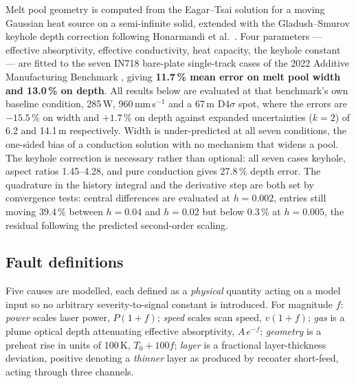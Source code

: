 \documentclass[preprint,times]{elsarticle}
\begin{document}
Melt pool geometry is computed from the Eagar--Tsai solution for a moving Gaussian
heat source on a semi-infinite solid, extended with the Gladush--Smurov keyhole
depth correction following Honarmandi et al.\ \cite{Hon2021}. Four parameters ---
effective absorptivity, effective conductivity, heat capacity, the keyhole
constant --- are fitted to the seven IN718 bare-plate single-track cases of the
2022 Additive Manufacturing Benchmark \cite{Weaver2024}, giving \textbf{11.7\,\%
mean error on melt pool width and 13.0\,\% on depth}. All results below are evaluated at that benchmark's own baseline condition,
285\,W, 960\,mm\,s$^{-1}$ and a 67\,\textmu m D4$\sigma$ spot, where the errors
are $-15.5$\,\% on width and $+1.7$\,\% on depth against expanded uncertainties
($k=2$) of 6.2 and 14.1\,\textmu m respectively. Width is under-predicted at all seven conditions, the one-sided bias of a
conduction solution with no mechanism that widens a pool. The keyhole correction
is necessary rather than optional: all seven cases keyhole, aspect ratios
1.45--4.28, and pure conduction gives 27.8\,\% depth error. The quadrature in the
history integral and the derivative step are both set by convergence tests:
central differences are evaluated at $h=0.002$, entries still moving 39.4\,\%
between $h=0.04$ and $h=0.02$ but below 0.3\,\% at $h=0.005$, the residual
following the predicted second-order scaling.

\subsection{Fault definitions}

Five causes are modelled, each defined as a \emph{physical} quantity acting on a
model input so no arbitrary severity-to-signal constant is introduced. For
magnitude $f$: \emph{power} scales laser power, $P(1+f)$; \emph{speed} scales
scan speed, $v(1+f)$; \emph{gas} is a plume optical depth attenuating effective
absorptivity, $A\,e^{-f}$; \emph{geometry} is a preheat rise in units of 100\,K,
$T_0+100f$; \emph{layer} is a fractional layer-thickness deviation, positive
denoting a \emph{thinner} layer as produced by recoater short-feed, acting
through three channels.
\end{document}
